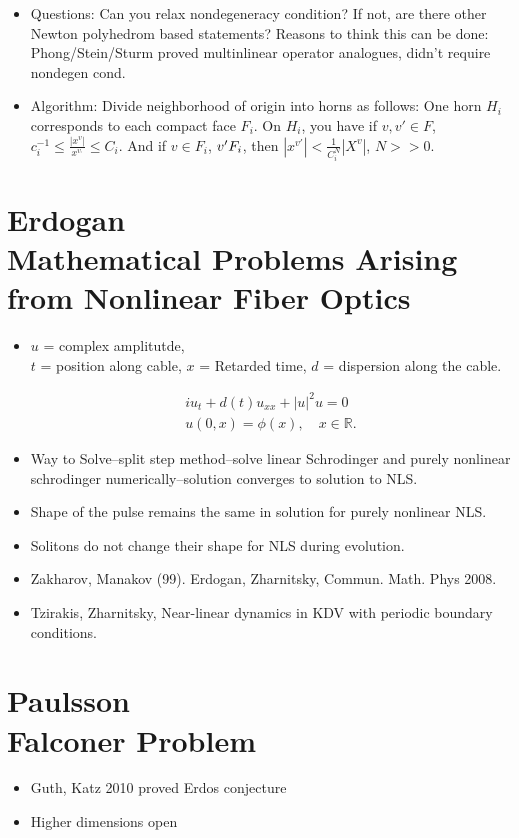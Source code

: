 \documentclass[12pt,reqno]{amsart}
\numberwithin{equation}{section}  %
\newcommand{\nin}{\noindent}
\newcommand{\rr}{\mathbb{R}}
\newtheorem{theorem}{Theorem}[section]
\begin{document}
\begin{itemize}
\begin{theorem}[Varchenko]
      let $S_{F}(x = \sum_{\alpha \in F} s_{\alpha} x^{\alpha}$. 
      
      Condition $\nabla S_{F} \neq 0$ on $(\rr - \left\{ 0 \right\})^{n}$ for all $F$. 
\end{theorem}
\item{}
  Questions: Can you relax nondegeneracy condition? If not, are there other Newton polyhedrom based statements? Reasons to think this can be done: Phong/Stein/Sturm proved multinlinear operator analogues, didn't require nondegen cond.
  \item{}
    Algorithm: Divide neighborhood of origin into horns as follows: One horn $H_{i}$ corresponds to each compact face $F_{i}$. On $H_{i}$, you have if $v, v' \in F$, $c_{i}^{-1} \le \frac{| x^{v} |}{x^{v_{'}}} \le C_{i}$. And if $v \in F_{i}$, $v' \nin F_{i}$, then $| x^{v'} | < \frac{1}{C_{i}^{N}}| X^{v} |$, $N >>0$. 
\end{itemize}

\section{Erdogan \\ Mathematical Problems Arising from Nonlinear Fiber Optics}

\begin{itemize}
  \item 
$u$ = complex amplitutde, \\
$t$ = position along cable, $x$ = Retarded time, $d$ = dispersion along the cable. 

    \begin{gather*}
    iu_{t} + d(t) u_{xx} + | u |^{2} u = 0
    \\
    u(0,x) = \phi(x), \quad x \in \rr.
    \end{gather*}
\end{itemize}
\begin{itemize}
  \item Way to Solve--split step method--solve linear Schrodinger and purely nonlinear schrodinger numerically--solution converges to solution to NLS.
    \item{}
    Shape of the pulse remains the same in solution for purely nonlinear NLS.
    \item{}
    Solitons do not change their shape for NLS during evolution.
    \item{}
    Zakharov, Manakov (99). Erdogan, Zharnitsky, Commun. Math. Phys 2008.
    \item{}
    Tzirakis, Zharnitsky, Near-linear dynamics in KDV with periodic boundary conditions.
\end{itemize}


\section{Paulsson \\ Falconer Problem}
\begin{itemize}
  \item 
    Guth, Katz 2010 proved Erdos conjecture
    \item{}
    Higher dimensions open
\end{itemize}
\end{document}
